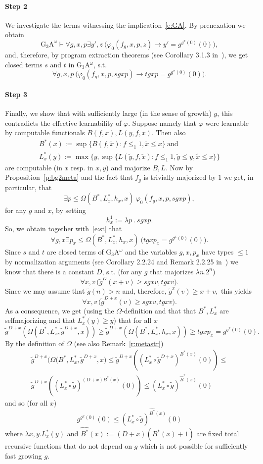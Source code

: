 \documentclass[1p]{elsarticle}
\newcommand{\ba}{\begin{array}} \newcommand{\ea}{\end{array}}
\newcommand{\be}[1][{e:\arabic{equation}}] { \begin{equation}\label{#1} }
\newcommand{\ee} { \end{equation} }
\theoremstyle{plain}
\theoremstyle{definition}
\theoremstyle{remark}
\renewenvironment{proof}[1][]{\noindent{\bf Proof{#1}. }}{\nopagebreak[4]{\hspace*{\fill}
  $\Box$              %
 }{\vspace{2ex}}}
\renewcommand{\phi}{\varphi}
\theoremstyle{definition}
\begin{document}
{\begin{proof}
\paragraph{Step 2} We investigate the terms witnessing the implication~\eqref{e:GA}. By prenexation we obtain
\[
\mbox{G$_3$A}^\omega\vdash \forall g,x,p\exists y',z\ \big(\phi_0(f_g,x,p,z)\rightarrow y'=g^{g^{x}(0)}(0)\big),
\]
and, therefore, by program extraction theorems (see Corollary 3.1.3 in~\cite{Kohlenbach(lowrate)}), we get closed terms $s$ and $t$ in G$_3$A$^\omega$, s.t.
\be[e:st]
\forall g,x,p\ \big(\phi_0(f_g,x,p,sgxp)\rightarrow tgxp=g^{g^{x}(0)}(0)\big).
\ee
\paragraph{Step 3} Finally, we show that with sufficiently large (in the sense of growth) $g$, this contradicts the effective learnability of $\phi$. Suppose namely that $\phi$ were learnable by computable functionals $B(f,x),L(y,f,x).$ 
Then also 
\[ \ba{l} B^*(x):=\sup \{ B(f,\tilde{x}): f\le_1 1, \tilde{x}\le x\} \ 
\mbox{and} \\ 
L^*_x(y):=\max\{ y,\sup \{ L(\tilde{y},f,\tilde{x}): f\le_1 1,\tilde{y}\le y,
\tilde{x}\le x\}\}\ea \] 
are computable (in $x$ resp. in $x,y$) and majorize $B,L.$ 
Now by Proposition~\ref{p:bg2meta} and the fact that $f_g$ is trivially 
majorized by $1$ we get, in particular, that 
\[
\exists p\leq \Omega(B^*,L^*_x,h_x,x)\ \phi_0(f_g,x,p, sgxp),
\]
for any $g$ and $x$, by setting \[h^1_x:=\lambda p\ .\ sgxp.\]
So, we obtain together with~\eqref{e:st} that
\[
\forall g,x \exists p_x\leq \Omega(B^*,L^*_x,h_x,x)\ 
\big( tgxp_x =g^{g^{x}(0)}(0)\big).
\]
Since $s$ and $t$ are closed terms of G$_3$A$^\omega$ and the variables 
$g,x,p_x$ have types $\le 1$ by normalization arguments
(see Corollary 2.2.24 and Remark 2.2.25 in~\cite{Kohlenbach(lowrate)}) we know that there is 
a constant $D$, s.t. (for any $g$ that majorizes $\lambda n.2^n$) 
\[ \forall x,v\, \big( \tilde{g}^D(x+v)\ge sgxv,tgxv\big).\] 
Since we may assume that $\tilde{g}(n)>n$ and, therefore, 
$\tilde{g}^x(v)\ge x+v,$ this yields 
\[ \forall x,v\,\big( \tilde{g}^{D+x}(v)\ge sgxv,tgxv\big). \]
As a consequence, we get (using the $\Omega$-definition 
and that that $B^*,L^*_x$ are selfmajorizing and that $L^*_x(y)\ge y$) 
that for all $x$  
\[ \tilde{g}^{D+x}\left(\Omega(B^*,L^*_x,\tilde{g}^{D+x},x)\right) \ge 
\tilde{g}^{D+x}\left(\Omega(B^*,L^*_x,h_x,x)\right) \ge 
tgxp_x=g^{g^x(0)}(0). \]
By the definition of $\Omega$ (see also Remark~\ref{r:metastr}) 
\[   \ba{l} \tilde{g}^{D+x}\big(\Omega(B^*,L^*_x,\tilde{g}^{D+x},x\big)\le 
\tilde{g}^{D+x}
\left((L^*_x\circ\tilde{g}^{D+x})^{B^*(x)}(0)\right) \le \\ 
\tilde{g}^{D+x}\left((L^*_x\circ\tilde{g})^{(D+x)B^*(x)}(0)\right)\le 
(L^*_x\circ \tilde{g})^{\widehat{B}^*(x)}(0)\ea \] 
and so (for all $x$)
\[  g^{g^x(0)}(0)\le (L^*_x\circ \tilde{g})^{\widehat{B^*}(x)}(0) \]
where $\lambda x,y.L^*_x(y)$ and $\widehat{B^*}(x):=(D+x)(B^*(x)+1)$ 
are fixed total recursive functions that do not depend 
on $g$ which is not possible for sufficiently fast growing $g$.
\end{proof}

}
\end{document}
